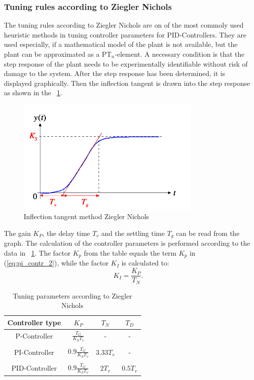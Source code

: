 \subsubsection{Tuning rules according to Ziegler Nichols}
The tuning rules according to Ziegler Nichols are on of the most commoly used heuristic methods in tuning controller parameters for PID-Controllers. They are used especially, if a mathematical model of the plant is not available, but the plant can be approximated as a PT$_{n}$-element. \cite{Reg_17}
A necessary condition is that the step response of the plant needs to be experimentally identifiable without risk of damage to the system. After the step response has been determined, it is displayed graphically. Then the inflection tangent is drawn into the step response as shown in the \figurename~\ref{fig:param_zn}.
\begin{figure}
   \centering
   \includegraphics[width=0.8\textwidth]{images/param_zn.jpg}
   \caption[Inflection tangent method Ziegler Nichols]{Inflection tangent method Ziegler Nichols}
   \label{fig:param_zn}
 \end{figure}
The gain $K_{P}$, the delay time $T_{v}$ and the settling time $T_{g}$ can be read from the graph.
The calculation of the controller parameters is performed according to the data in \tablename~\ref{tab:param_zn}. The factor $K_{p}$ from the table equals the term $K_{p}$ in (\ref{eq:pi_contr_2}), while the factor $K_{I}$ is calculated to:
\begin{equation}
    K_{I}  = \frac{K_{P}}{T_{N}}.
 \label{eq:K_I}
\end{equation}
\begin{table}
  \centering
  \begin{tabularx}{0.6\textwidth}{c|c|c|c}
    \toprule
    Controller type & $K_{P}$ &  $T_{N}$ & $T_{D}$   \\
    \midrule
    P-Controller &  $\frac{T_{G}}{K_{S}T_{v}}$ & - & - \\
    & & & \\
    PI-Controller & $0.9\frac{T_{G}}{K_{S}T_{v}}$ & $3.33T_{v}$ & - \\
    & & & \\
    PID-Controller & $0.9\frac{T_{G}}{K_{S}T_{v}}$ & $2T_{v}$ & $0.5T_{v}$ \\
     \bottomrule
  \end{tabularx}
  \caption[Tuning parameters Ziegler Nichols]{Tuning parameters according to Ziegler Nichols}
  \label{tab:param_zn}
\end{table}

